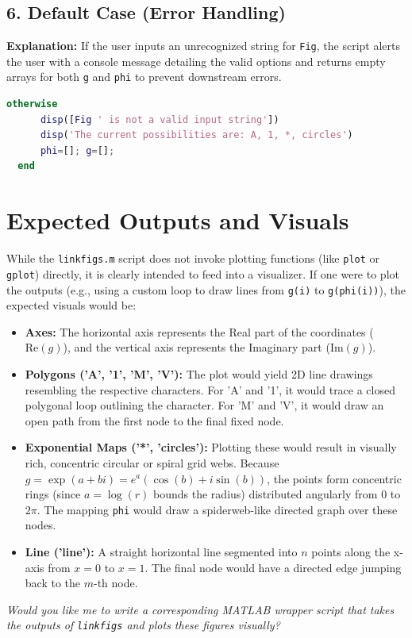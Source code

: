 \subsection{6. Default Case (Error Handling)}
\textbf{Explanation:} If the user inputs an unrecognized string for \texttt{Fig}, the script alerts the user with a console message detailing the valid options and returns empty arrays for both \texttt{g} and \texttt{phi} to prevent downstream errors.

\begin{lstlisting}[language=Matlab]
    otherwise
      disp([Fig ' is not a valid input string'])
      disp('The current possibilities are: A, 1, *, circles')
      phi=[]; g=[];
  end
\end{lstlisting}

\section{Expected Outputs and Visuals}

While the \texttt{linkfigs.m} script does not invoke plotting functions (like \texttt{plot} or \texttt{gplot}) directly, it is clearly intended to feed into a visualizer. If one were to plot the outputs (e.g., using a custom loop to draw lines from \texttt{g(i)} to \texttt{g(phi(i))}), the expected visuals would be:

\begin{itemize}
    \item \textbf{Axes:} The horizontal axis represents the Real part of the coordinates ($\text{Re}(g)$), and the vertical axis represents the Imaginary part ($\text{Im}(g)$).
    \item \textbf{Polygons ('A', '1', 'M', 'V'):} The plot would yield 2D line drawings resembling the respective characters. For 'A' and '1', it would trace a closed polygonal loop outlining the character. For 'M' and 'V', it would draw an open path from the first node to the final fixed node.
    \item \textbf{Exponential Maps ('*', 'circles'):} Plotting these would result in visually rich, concentric circular or spiral grid webs. Because $g = \exp(a + bi) = e^a(\cos(b) + i\sin(b))$, the points form concentric rings (since $a = \log(r)$ bounds the radius) distributed angularly from $0$ to $2\pi$. The mapping \texttt{phi} would draw a spiderweb-like directed graph over these nodes.
    \item \textbf{Line ('line'):} A straight horizontal line segmented into $n$ points along the x-axis from $x=0$ to $x=1$. The final node would have a directed edge jumping back to the $m$-th node.
\end{itemize}

\vspace{1em}
\noindent \textit{Would you like me to write a corresponding MATLAB wrapper script that takes the outputs of \texttt{linkfigs} and plots these figures visually?}
